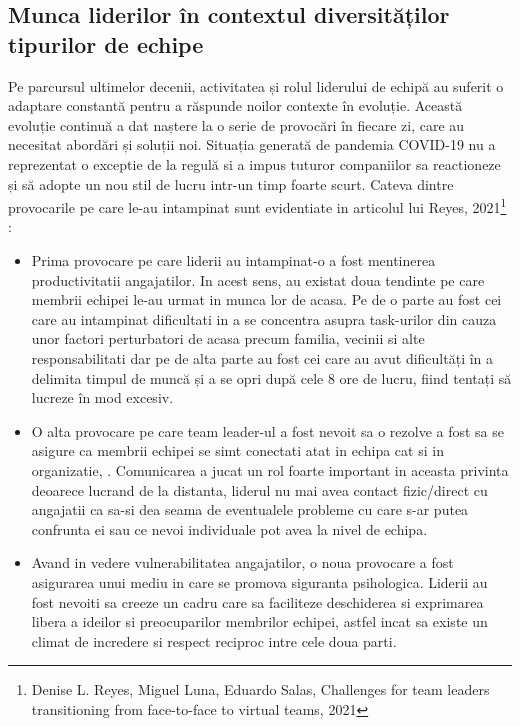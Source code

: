 \documentclass[a4paper, 12pt]{article}
\begin{document}
	\subsection{Munca liderilor în contextul diversităților tipurilor de echipe }

	\quad\quad Pe parcursul ultimelor decenii, activitatea și rolul liderului de echipă au suferit o adaptare constantă pentru a răspunde noilor contexte în evoluție. Această evoluție continuă a dat naștere la o serie de provocări în fiecare zi, care au necesitat abordări și soluții noi. Situația generată de pandemia COVID-19 nu a reprezentat o exceptie de la regulă si a impus tuturor companiilor sa  reactioneze și să adopte un nou stil de lucru intr-un timp foarte scurt. Cateva dintre provocarile pe care le-au intampinat sunt evidentiate in articolul lui Reyes, 2021\footnote{Denise L. Reyes, Miguel Luna, Eduardo Salas, Challenges for team leaders transitioning from face-to-face to virtual teams, 2021} :

	\begin{itemize}

	\item Prima provocare pe care liderii au intampinat-o a fost mentinerea productivitatii angajatilor. In acest sens, au existat doua tendinte pe care membrii echipei le-au urmat in munca lor de acasa. Pe de o parte au fost cei care au intampinat dificultati in a se concentra asupra task-urilor din cauza unor factori perturbatori de acasa precum familia, vecinii si alte responsabilitati dar pe de alta parte au fost cei care au avut dificultăți în a delimita timpul de muncă și a se opri după cele 8 ore de lucru,  fiind tentați să lucreze în mod excesiv.

	\item O alta provocare pe care team leader-ul a fost nevoit sa o rezolve a fost sa se asigure ca membrii echipei se simt conectati atat in echipa cat si in organizatie, . Comunicarea a jucat un rol foarte important in aceasta privinta deoarece lucrand de la distanta, liderul nu mai avea contact fizic/direct cu angajatii ca sa-si dea seama de eventualele probleme cu care s-ar putea confrunta ei sau ce nevoi individuale pot avea la nivel de echipa.

	\item Avand in vedere vulnerabilitatea angajatilor, o noua provocare a fost asigurarea unui mediu in care se promova siguranta psihologica. Liderii au fost nevoiti sa creeze un cadru care sa faciliteze deschiderea si exprimarea libera a ideilor si preocuparilor membrilor echipei, astfel incat sa existe un climat de incredere si respect reciproc intre cele doua parti. 

	\end{itemize}
\end{document}
